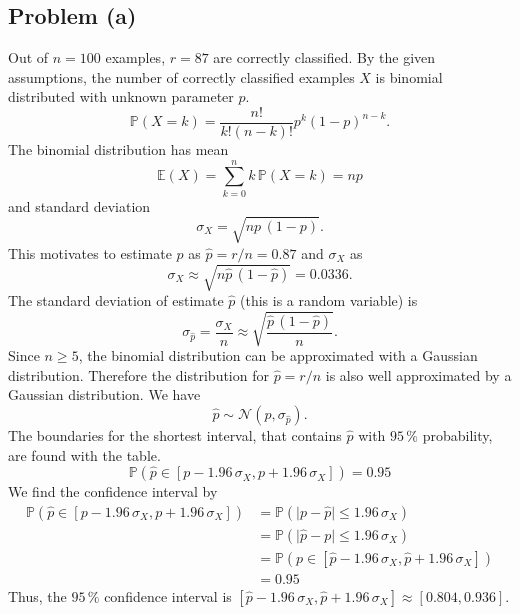 \subsection*{Problem (a)}

Out of $n=100$ examples, $r=87$ are correctly classified. By the
given assumptions, the number of correctly classified examples $X$
is binomial distributed with unknown parameter $p$.
\[
\mathbb{P}(X=k)=\frac{n!}{k!(n-k)!}p^{k}(1-p)^{n-k}.
\]
The binomial distribution has mean
\[
\mathbb{E}(X)=\sum_{k=0}^{n}k\,\mathbb{P}(X=k)=np
\]
and standard deviation 
\[
\sigma_{X}=\sqrt{np\,(1-p)}.
\]
This motivates to estimate $p$ as $\hat{p}=r/n=0.87$ and $\sigma_{X}$
 as 
\[
\sigma_{X}\approx\sqrt{n\hat{p}\,(1-\hat{p})}=0.0336.
\]
 The standard deviation of estimate $\hat{p}$ (this is a random variable)
is
\[
\sigma_{\hat{p}}=\frac{\sigma_{X}}{n}\approx\sqrt{\frac{\hat{p}\,(1-\hat{p})}{n}}.
\]
Since $n\geq5$, the binomial distribution can be approximated with
a Gaussian distribution. Therefore the distribution for $\hat{p}=r/n$
is also well approximated by a Gaussian distribution. We have
\[
\hat{p}\sim\mathcal{N}(p,\sigma_{\hat{p}}).
\]
The boundaries for the shortest interval, that contains $\hat{p}$
with $95\,\%$ probability, are found with the table.
\[
\mathbb{P}\left(\hat{p}\in\left[p-1.96\,\sigma_{X},p+1.96\,\sigma_{X}\right]\right)=0.95
\]
We find the confidence interval by 
\begin{align*}
\mathbb{P}\left(\hat{p}\in\left[p-1.96\,\sigma_{X},p+1.96\,\sigma_{X}\right]\right) & =\mathbb{P}\left(\vert p-\hat{p}\vert\leq1.96\,\sigma_{X}\right)\\
 & =\mathbb{P}\left(\vert\hat{p}-p\vert\leq1.96\,\sigma_{X}\right)\\
 & =\mathbb{P}\left(p\in\left[\hat{p}-1.96\,\sigma_{X},\hat{p}+1.96\,\sigma_{X}\right]\right)\\
 & =0.95
\end{align*}
Thus, the $95\,\%$ confidence interval is $\left[\hat{p}-1.96\,\sigma_{X},\hat{p}+1.96\,\sigma_{X}\right]\approx\left[0.804,0.936\right]$.